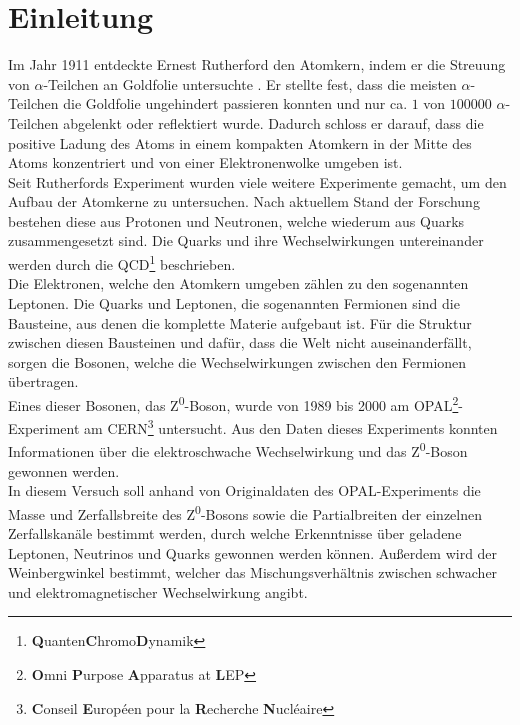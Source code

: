 \section{Einleitung}

Im Jahr 1911 entdeckte Ernest Rutherford den Atomkern, indem er die Streuung von $\alpha$-Teilchen an Goldfolie untersuchte \cite{rutherford}. Er stellte fest, dass die meisten $\alpha$-Teilchen die Goldfolie ungehindert passieren konnten und nur ca. $1$ von $100000$ $\alpha$-Teilchen abgelenkt oder reflektiert wurde. Dadurch schloss er darauf, dass die positive Ladung des Atoms in einem kompakten Atomkern in der Mitte des Atoms konzentriert und von einer Elektronenwolke umgeben ist.\\

Seit Rutherfords Experiment wurden viele weitere Experimente gemacht, um den Aufbau der Atomkerne zu untersuchen. Nach aktuellem Stand der Forschung bestehen diese aus Protonen und Neutronen, welche wiederum aus Quarks zusammengesetzt sind. Die Quarks und ihre Wechselwirkungen untereinander werden durch die QCD\footnote{\textbf{Q}uanten\textbf{C}hromo\textbf{D}ynamik} beschrieben.\\

Die Elektronen, welche den Atomkern umgeben zählen zu den sogenannten Leptonen. Die Quarks und Leptonen, die sogenannten Fermionen sind die Bausteine, aus denen die komplette Materie aufgebaut ist. Für die Struktur zwischen diesen Bausteinen und dafür, dass die Welt nicht auseinanderfällt, sorgen die Bosonen, welche die Wechselwirkungen zwischen den Fermionen übertragen.\\

Eines dieser Bosonen, das Z\textsuperscript0-Boson, wurde von 1989 bis 2000 am OPAL\footnote{\textbf Omni \textbf Purpose \textbf Apparatus at \textbf LEP}-Experiment am CERN\footnote{\textbf{C}onseil \textbf{E}uropéen pour la \textbf{R}echerche \textbf{N}ucléaire} untersucht. Aus den Daten dieses Experiments konnten Informationen über die elektroschwache Wechselwirkung und das Z\textsuperscript0-Boson gewonnen werden.\\

In diesem Versuch soll anhand von Originaldaten des OPAL-Experiments die Masse und Zerfallsbreite des Z\textsuperscript0-Bosons sowie die Partialbreiten der einzelnen Zerfallskanäle bestimmt werden, durch welche Erkenntnisse über geladene Leptonen, Neutrinos und Quarks gewonnen werden können. Außerdem wird der Weinbergwinkel bestimmt, welcher das Mischungsverhältnis zwischen schwacher und elektromagnetischer Wechselwirkung angibt.